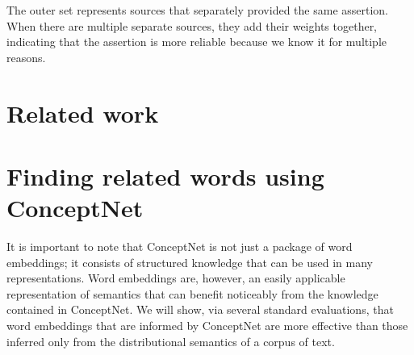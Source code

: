 \documentclass[letterpaper]{article}
\begin{document}
The outer set represents sources that separately provided the same
assertion. When there are multiple separate sources, they add their
weights together, indicating that the assertion is more reliable because
we know it for multiple reasons.





\section{Related work}



\section{Finding related words using ConceptNet}
\label{finding-related-words-using-conceptnet}

It is important to note that ConceptNet is not just a package of word
embeddings; it consists of structured knowledge that can be used in many
representations.  Word embeddings are, however, an easily applicable
representation of semantics that can benefit noticeably from the knowledge
contained in ConceptNet. We will show, via several standard evaluations, that
word embeddings that are informed by ConceptNet are more effective than those
inferred only from the distributional semantics of a corpus of text.
\end{document}
